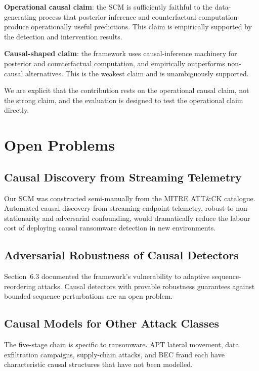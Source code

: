 \documentclass[sigconf,nonacm]{acmart}
\begin{document}
\textbf{Operational causal claim}: the SCM is sufficiently faithful to
the data-generating process that posterior inference and
counterfactual computation produce operationally useful predictions.
This claim is empirically supported by the detection and intervention
results.

\textbf{Causal-shaped claim}: the framework uses causal-inference
machinery for posterior and counterfactual computation, and
empirically outperforms non-causal alternatives. This is the weakest
claim and is unambiguously supported.

We are explicit that the contribution rests on the operational
causal claim, not the strong claim, and the evaluation is designed to
test the operational claim directly.

\section{Open Problems}

\subsection{Causal Discovery from Streaming Telemetry}

Our SCM was constructed semi-manually from the MITRE
ATT\&CK catalogue. Automated causal discovery from streaming endpoint
telemetry, robust to non-stationarity and adversarial confounding,
would dramatically reduce the labour cost of deploying causal
ransomware detection in new environments.

\subsection{Adversarial Robustness of Causal Detectors}

Section~6.3 documented the framework's vulnerability to adaptive
sequence-reordering attacks. Causal detectors with provable robustness
guarantees against bounded sequence perturbations are an open
problem.

\subsection{Causal Models for Other Attack Classes}

The five-stage chain is specific to ransomware. APT lateral movement,
data exfiltration campaigns, supply-chain attacks, and BEC fraud
each have characteristic causal structures that have not been
modelled.
\end{document}

